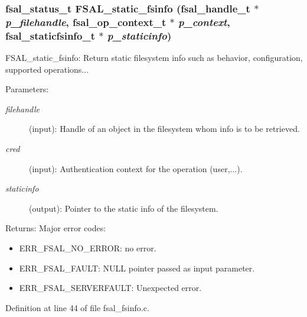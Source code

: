 \subsubsection[{FSAL\_\-static\_\-fsinfo}]{\setlength{\rightskip}{0pt plus 5cm}fsal\_\-status\_\-t FSAL\_\-static\_\-fsinfo (fsal\_\-handle\_\-t $\ast$ {\em p\_\-filehandle}, \/  fsal\_\-op\_\-context\_\-t $\ast$ {\em p\_\-context}, \/  fsal\_\-staticfsinfo\_\-t $\ast$ {\em p\_\-staticinfo})}\label{fsal__fsinfo_8c_a1e88e9fb3ed785f6976f1f81f3be20e}


FSAL\_\-static\_\-fsinfo: Return static filesystem info such as behavior, configuration, supported operations...

\begin{Desc}
\item[Parameters:]
\begin{description}
\item[{\em filehandle}](input): Handle of an object in the filesystem whom info is to be retrieved. \item[{\em cred}](input): Authentication context for the operation (user,...). \item[{\em staticinfo}](output): Pointer to the static info of the filesystem.\end{description}
\end{Desc}
\begin{Desc}
\item[Returns:]Major error codes:\begin{itemize}
\item ERR\_\-FSAL\_\-NO\_\-ERROR: no error.\item ERR\_\-FSAL\_\-FAULT: NULL pointer passed as input parameter.\item ERR\_\-FSAL\_\-SERVERFAULT: Unexpected error. \end{itemize}
\end{Desc}


Definition at line 44 of file fsal\_\-fsinfo.c.